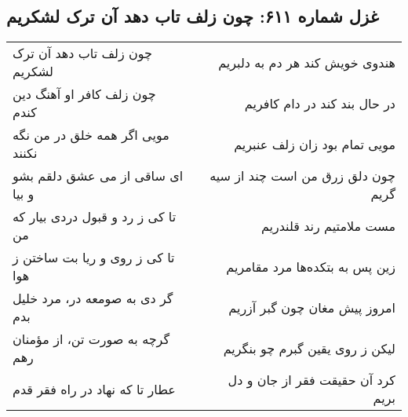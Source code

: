 \begin{center}
\section*{غزل شماره ۶۱۱: چون زلف تاب دهد آن ترک لشکریم}
\label{sec:611}
\begin{longtable}{l p{0.5cm} r}
چون زلف تاب دهد آن ترک لشکریم
&&
هندوی خویش کند هر دم به دلبریم
\\
چون زلف کافر او آهنگ دین کندم
&&
در حال بند کند در دام کافریم
\\
مویی اگر همه خلق در من نگه نکنند
&&
مویی تمام بود زان زلف عنبریم
\\
ای ساقی از می عشق دلقم بشو و بیا
&&
چون دلق زرق من است چند از سیه گریم
\\
تا کی ز رد و قبول دردی بیار که من
&&
مست ملامتیم رند قلندریم
\\
تا کی ز روی و ریا بت ساختن ز هوا
&&
زین پس به بتکده‌ها مرد مقامریم
\\
گر دی به صومعه در، مرد خلیل بدم
&&
امروز پیش مغان چون گبر آزریم
\\
گرچه به صورت تن، از مؤمنان رهم
&&
لیکن ز روی یقین گبرم چو بنگریم
\\
عطار تا که نهاد در راه فقر قدم
&&
کرد آن حقیقت فقر از جان و دل بریم
\\
\end{longtable}
\end{center}

